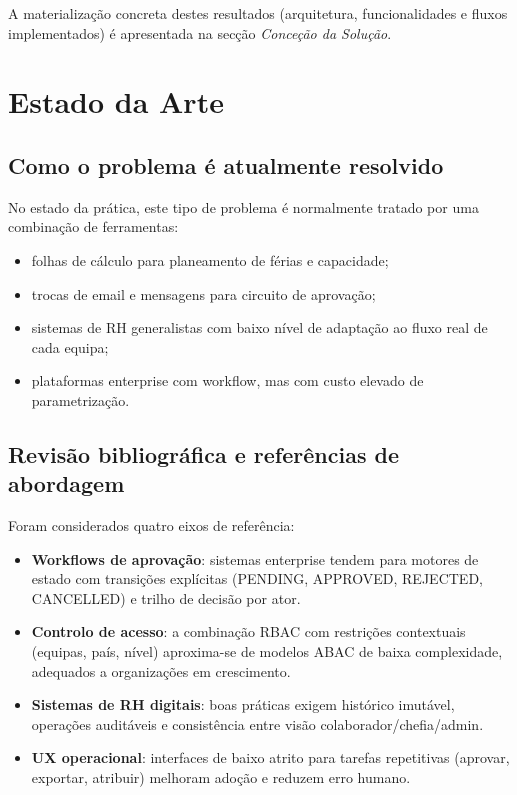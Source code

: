 \documentclass[11pt,a4paper]{article}
\begin{document}
\noindent A materialização concreta destes resultados (arquitetura, funcionalidades e fluxos implementados) é apresentada na secção \textit{Conceção da Solução}.

\section{Estado da Arte}
\subsection{Como o problema é atualmente resolvido}
No estado da prática, este tipo de problema é normalmente tratado por uma combinação de ferramentas:

\begin{itemize}
  \item folhas de cálculo para planeamento de férias e capacidade;
  \item trocas de email e mensagens para circuito de aprovação;
  \item sistemas de RH generalistas com baixo nível de adaptação ao fluxo real de cada equipa;
  \item plataformas enterprise com workflow, mas com custo elevado de parametrização.
\end{itemize}

\subsection{Revisão bibliográfica e referências de abordagem}
Foram considerados quatro eixos de referência:

\begin{itemize}
  \item \textbf{Workflows de aprovação}: sistemas enterprise tendem para motores de estado com transições explícitas (PENDING, APPROVED, REJECTED, CANCELLED) e trilho de decisão por ator.
  \item \textbf{Controlo de acesso}: a combinação RBAC com restrições contextuais (equipas, país, nível) aproxima-se de modelos ABAC de baixa complexidade, adequados a organizações em crescimento.
  \item \textbf{Sistemas de RH digitais}: boas práticas exigem histórico imutável, operações auditáveis e consistência entre visão colaborador/chefia/admin.
  \item \textbf{UX operacional}: interfaces de baixo atrito para tarefas repetitivas (aprovar, exportar, atribuir) melhoram adoção e reduzem erro humano.
\end{itemize}
\end{document}
